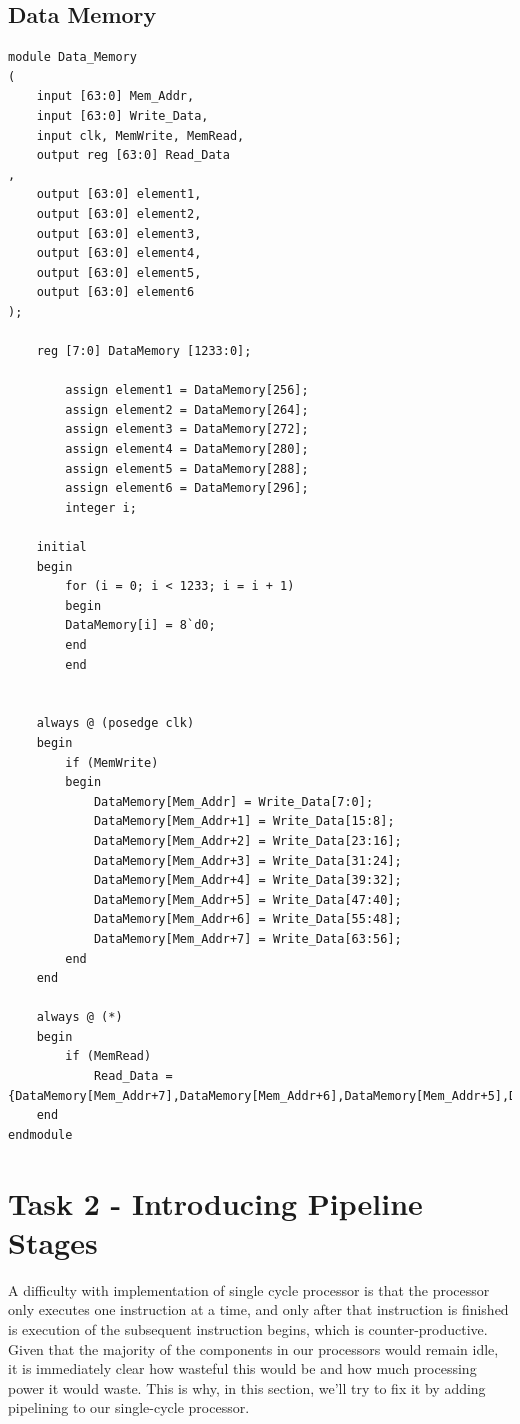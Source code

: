 \documentclass{article}
\begin{document}
\subsection{Data Memory}

\begin{lstlisting}[caption={Changes to Data Memory}, captionpos=b, language=RISC-V]
module Data_Memory
(
    input [63:0] Mem_Addr,
    input [63:0] Write_Data,
    input clk, MemWrite, MemRead,
    output reg [63:0] Read_Data
, 
    output [63:0] element1,
    output [63:0] element2,
    output [63:0] element3,
    output [63:0] element4,
    output [63:0] element5,
    output [63:0] element6
);

    reg [7:0] DataMemory [1233:0];

        assign element1 = DataMemory[256];
        assign element2 = DataMemory[264];
        assign element3 = DataMemory[272];                      
        assign element4 = DataMemory[280];
        assign element5 = DataMemory[288];
        assign element6 = DataMemory[296];
        integer i;
    
    initial  
    begin 
        for (i = 0; i < 1233; i = i + 1)
        begin 
        DataMemory[i] = 8`d0;
        end
        end    

    
    always @ (posedge clk)
    begin
        if (MemWrite)
        begin
            DataMemory[Mem_Addr] = Write_Data[7:0];
            DataMemory[Mem_Addr+1] = Write_Data[15:8];
            DataMemory[Mem_Addr+2] = Write_Data[23:16];
            DataMemory[Mem_Addr+3] = Write_Data[31:24];
            DataMemory[Mem_Addr+4] = Write_Data[39:32];
            DataMemory[Mem_Addr+5] = Write_Data[47:40];
            DataMemory[Mem_Addr+6] = Write_Data[55:48];
            DataMemory[Mem_Addr+7] = Write_Data[63:56];
        end
    end
    
    always @ (*)
    begin
        if (MemRead)
            Read_Data = {DataMemory[Mem_Addr+7],DataMemory[Mem_Addr+6],DataMemory[Mem_Addr+5],DataMemory[Mem_Addr+4],DataMemory[Mem_Addr+3],DataMemory[Mem_Addr+2],DataMemory[Mem_Addr+1],DataMemory[Mem_Addr]};
    end
endmodule
\end{lstlisting}

\section{Task 2 - Introducing Pipeline Stages}

A difficulty with implementation of single cycle processor is that the processor only executes one instruction at a time, and only after that instruction is finished is execution of the subsequent instruction begins, which is counter-productive. Given that the majority of the components in our processors would remain idle, it is immediately clear how wasteful this would be and how much processing power it would waste. This is why, in this section, we'll try to fix it by adding pipelining to our single-cycle processor.
\end{document}
